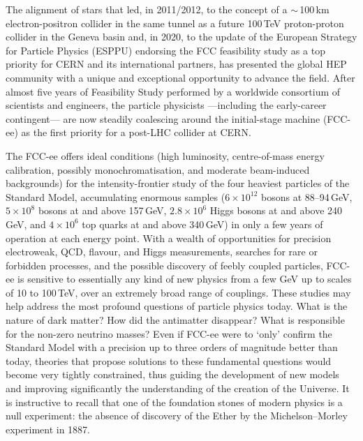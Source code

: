 The alignment of stars that led, in 2011/2012, to the concept of a $\sim$\,100\,km electron-positron collider in the same tunnel as a future 100\,TeV proton-proton collider in the Geneva basin and, in 2020, to the update of the European Strategy for Particle Physics (ESPPU) endorsing the FCC feasibility study as a top priority for CERN and its international partners, has presented the global HEP community with a unique and exceptional opportunity to advance the field. 
After almost five years of Feasibility Study performed by a worldwide consortium of scientists and engineers, the particle physicists ---including the early-career contingent--- are now steadily coalescing around the initial-stage machine (FCC-ee) as the first priority for a post-LHC collider at CERN. 

The FCC-ee offers ideal conditions (high luminosity, centre-of-mass energy calibration, possibly mono\-chromatisation, and moderate beam-induced backgrounds) for the intensity-frontier study of the four heaviest particles of the Standard Model, accumulating enormous samples ($6\times 10^{12}$ \PZ bosons at 88--94\,GeV, $5 \times 10^8$ \PW bosons at and above 157\,GeV, $2.8 \times 10^6$ Higgs bosons at and above 240\,GeV, and $4 \times 10^6$ top quarks at and above 340\,GeV) in only a few years of operation at each energy point. With a wealth of opportunities for precision electroweak, QCD, flavour, and Higgs measurements, searches for rare or forbidden processes, and the possible discovery of feebly coupled particles, \mbox{FCC-ee} is sensitive to essentially any kind of new physics from a few GeV up to scales of 10 to 100\,TeV, over an extremely broad range of couplings. These studies may help address the most profound questions of particle physics today. What is the nature of dark matter? How did the antimatter disappear? What is responsible for the non-zero neutrino masses? Even if \mbox{FCC-ee} were to `only' confirm the Standard Model with a precision up to three orders of magnitude better than today, theories that propose solutions to these fundamental questions would become very tightly constrained, thus guiding the development of new models and improving significantly the understanding of the creation of the Universe. It is instructive to recall that one of the foundation stones of modern physics is a null experiment: the absence of discovery of the Ether by the Michelson--Morley experiment in 1887.

